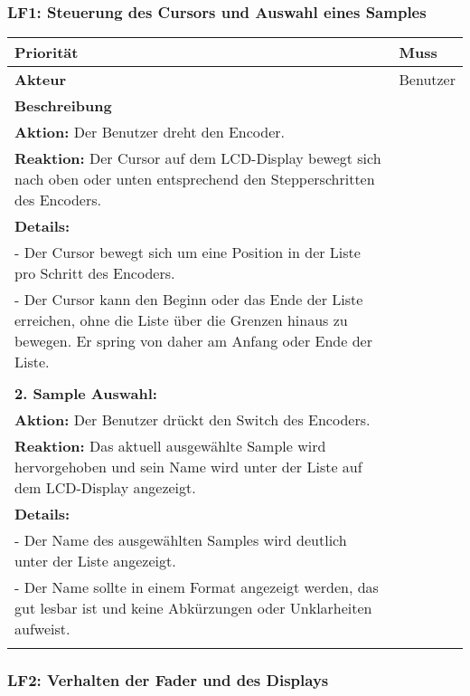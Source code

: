 \subsubsection{LF1: Steuerung des Cursors und Auswahl eines Samples}

\begin{longtable}[c]{|p{3cm}|p{13cm}|}
	\hline
	\textbf{Priorität} & Muss \\
	\hline
	\textbf{Akteur} & Benutzer \\
	\hline
	\textbf{Beschreibung} & 
	\begin{tabularx}{13cm}{X}
		\textbf{1. Cursor Bewegung:} \\
		\textbf{Aktion:} Der Benutzer dreht den Encoder. \\
		\textbf{Reaktion:} Der Cursor auf dem LCD-Display bewegt sich nach oben oder unten entsprechend den Stepperschritten des Encoders. \\
		\textbf{Details:} \\
		- Der Cursor bewegt sich um eine Position in der Liste pro Schritt des Encoders. \\
		- Der Cursor kann den Beginn oder das Ende der Liste erreichen, ohne die Liste über die Grenzen hinaus zu bewegen. Er spring von daher am Anfang oder Ende der Liste. \\
		\\
		\textbf{2. Sample Auswahl:} \\
		\textbf{Aktion:} Der Benutzer drückt den Switch des Encoders. \\
		\textbf{Reaktion:} Das aktuell ausgewählte Sample wird hervorgehoben und sein Name wird unter der Liste auf dem LCD-Display angezeigt. \\
		\textbf{Details:} \\
		- Der Name des ausgewählten Samples wird deutlich unter der Liste angezeigt. \\
		- Der Name sollte in einem Format angezeigt werden, das gut lesbar ist und keine Abkürzungen oder Unklarheiten aufweist. \\
	\end{tabularx} \\
	\hline
\end{longtable}

\newpage
\subsubsection{LF2: Verhalten der Fader und des Displays}

